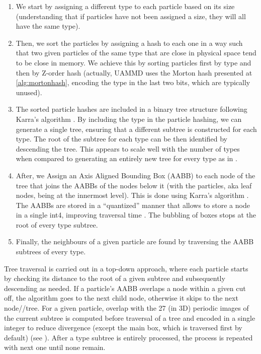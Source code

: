 \documentclass[twoside,openright,titlepage,numbers=noenddot,%
headinclude,footinclude,cleardoublepage=empty,abstract=on,
BCOR=5mm,fontsize=11pt, dvipsnames, paper=b5
]{scrreprt}
\begin{document}
\begin{enumerate}
\item We start by assigning a different type to each particle based on its size (understanding that if particles have not been assigned a size, they will all have the same type).
\item Then, we sort the particles by assigning a hash to each one in a way such that two given particles of the same type that are close in physical space tend to be close in memory. We achieve this by sorting particles first by type and then by Z-order hash (actually, UAMMD uses the Morton hash presented at \ref{alg:mortonhash}, encoding the type in the last two bits, which are typically unused).
\item The sorted particle hashes are included in a binary tree structure following Karra's algorithm \cite{Karras2012}.
  By including the type in the particle hashing, we can generate a single tree, ensuring that a different subtree is constructed for each type. The root of the subtree for each type can be then identified by descending the tree. This appears to scale well with the number of types when compared to generating an entirely new tree for every type as in \cite{Howard2016,Howard2019}.
\item After, we Assign an Axis Aligned Bounding Box (AABB) to each node of the tree that joins the AABBs of the nodes below it (with the particles, aka leaf nodes, being at the innermost level). This is done using Karra's algorithm \cite{Karras2012}. The AABBs are stored in a ``quantized'' manner that allows to store a node in a single int4, improving traversal time \cite{Howard2019}. The bubbling of boxes stops at the root of every type subtree.
\item Finally, the neighbours of a given particle are found by traversing the AABB subtrees of every type\cite{Torres2009}.
\end{enumerate}
   
Tree traversal is carried out in a top-down approach, where each particle starts by checking its distance to the root of a given subtree and subsequently descending as needed. If a particle's AABB overlaps a node within a given cut off, the algorithm goes to the next child node, otherwise it skips to the next node//tree.
For a given particle, overlap with the 27 (in 3D) periodic images of the current subtree is computed before traversal of a tree and encoded in a single integer to reduce divergence (except the main box, which is traversed first by default) (see \cite{Howard2019}).
After a type subtree is entirely processed, the process is repeated with next one until none remain.
\end{document}
